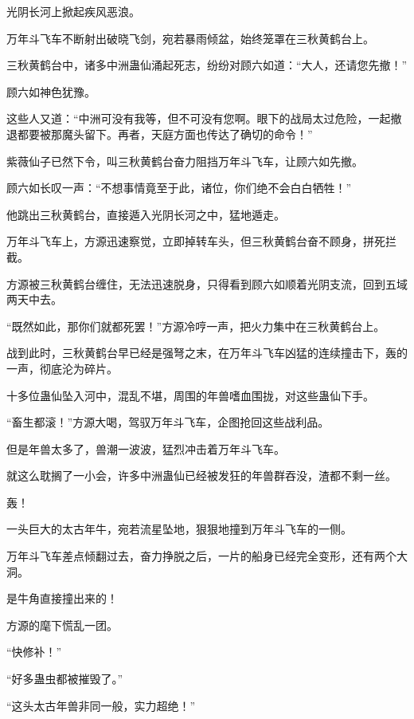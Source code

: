 
\begin{this_body}



光阴长河上掀起疾风恶浪。

万年斗飞车不断射出破晓飞剑，宛若暴雨倾盆，始终笼罩在三秋黄鹤台上。

三秋黄鹤台中，诸多中洲蛊仙涌起死志，纷纷对顾六如道：“大人，还请您先撤！”

顾六如神色犹豫。

这些人又道：“中洲可没有我等，但不可没有您啊。眼下的战局太过危险，一起撤退都要被那魔头留下。再者，天庭方面也传达了确切的命令！”

紫薇仙子已然下令，叫三秋黄鹤台奋力阻挡万年斗飞车，让顾六如先撤。

顾六如长叹一声：“不想事情竟至于此，诸位，你们绝不会白白牺牲！”

他跳出三秋黄鹤台，直接遁入光阴长河之中，猛地遁走。

万年斗飞车上，方源迅速察觉，立即掉转车头，但三秋黄鹤台奋不顾身，拼死拦截。

方源被三秋黄鹤台缠住，无法迅速脱身，只得看到顾六如顺着光阴支流，回到五域两天中去。

“既然如此，那你们就都死罢！”方源冷哼一声，把火力集中在三秋黄鹤台上。

战到此时，三秋黄鹤台早已经是强弩之末，在万年斗飞车凶猛的连续撞击下，轰的一声，彻底沦为碎片。

十多位蛊仙坠入河中，混乱不堪，周围的年兽嗜血围拢，对这些蛊仙下手。

“畜生都滚！”方源大喝，驾驭万年斗飞车，企图抢回这些战利品。

但是年兽太多了，兽潮一波波，猛烈冲击着万年斗飞车。

就这么耽搁了一小会，许多中洲蛊仙已经被发狂的年兽群吞没，渣都不剩一丝。

轰！

一头巨大的太古年牛，宛若流星坠地，狠狠地撞到万年斗飞车的一侧。

万年斗飞车差点倾翻过去，奋力挣脱之后，一片的船身已经完全变形，还有两个大洞。

是牛角直接撞出来的！

方源的麾下慌乱一团。

“快修补！”

“好多蛊虫都被摧毁了。”

“这头太古年兽非同一般，实力超绝！”


\end{this_body}
